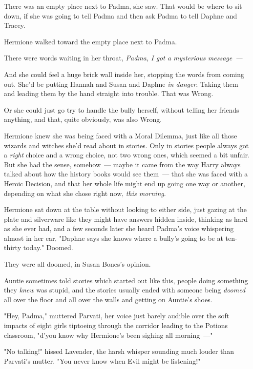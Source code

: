 There was an empty place next to Padma, she saw. That would be where to sit
down, if she was going to tell Padma and then ask Padma to tell Daphne and
Tracey.

Hermione walked toward the empty place next to Padma.

There were words waiting in her throat, \emph{Padma, I got a
mysterious message~--- }

And she could feel a huge brick wall inside her, stopping the words from coming
out. She'd be putting Hannah and Susan and Daphne \emph{in danger}. Taking them
and leading them by the hand straight into trouble. That was Wrong.

Or she could just go try to handle the bully herself, without telling her
friends anything, and that, quite obviously, was also Wrong.

Hermione knew she was being faced with a Moral Dilemma, just like all those
wizards and witches she'd read about in stories. Only in stories people always
got a \emph{right} choice and a wrong choice, not two wrong ones, which seemed
a bit unfair. But she had the sense, somehow~--- maybe it came from the way Harry
always talked about how the history books would see them~--- that she was faced
with a Heroic Decision, and that her whole life might end up going one way or
another, depending on what she chose right now, \emph{this morning}.

Hermione sat down at the table without looking to either side, just gazing at
the plate and silverware like they might have answers hidden inside, thinking
as hard as she ever had, and a few seconds later she heard Padma's voice
whispering almost in her ear, "Daphne says she knows where a bully's going to
be at ten-thirty today."
\sbreak
Doomed.

They were all doomed, in Susan Bones's opinion.

Auntie sometimes told stories which started out like this, people doing
something they \emph{knew} was stupid, and the stories usually ended with
someone being \emph{doomed} all over the floor and all over the walls and
getting on Auntie's shoes.

"Hey, Padma," muttered Parvati, her voice just barely audible over the soft
impacts of eight girls tiptoeing through the corridor leading to the Potions
classroom, "d'you know why Hermione's been sighing all morning~---"

"No talking!" hissed Lavender, the harsh whisper sounding much louder than
Parvati's mutter. "You never know when Evil might be listening!"

